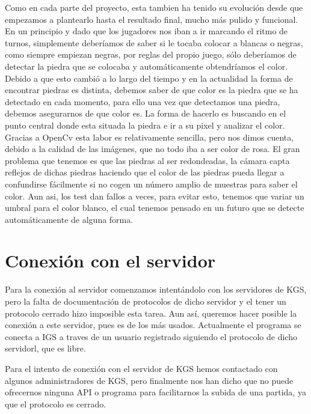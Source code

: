 \documentclass[12pt,a4paper]{report}
\begin{document}
Como en cada parte del proyecto, esta tambien ha tenido su evolución desde que
empezamos a plantearlo hasta el resultado final, mucho más pulido y funcional.
En un principio y dado que los jugadores nos iban a ir marcando el ritmo de
turnos, simplemente deberíamos de saber si le tocaba colocar a blancas o negras, como
siempre empiezan negras, por reglas del propio juego, sólo deberíamos de detectar la
piedra que se colocaba y automáticamente obtendríamos el color. 
Debido a que esto cambió a lo largo del tiempo y en la actualidad la forma de
encontrar piedras es distinta, debemos saber de que color es la piedra que se ha
detectado en cada momento, para ello una vez que detectamos una piedra, debemos
asegurarnos de que color es. La forma de hacerlo es buscando en el punto central
donde esta situada la piedra e ir a su pixel y analizar el color. Gracias a
OpenCv esta labor es relativamente sencilla, pero nos dimos cuenta, debido a la
calidad de las imágenes, que no todo iba a ser color de rosa. El gran problema
que tenemos es que las piedras al ser redondeadas, la cámara capta reflejos de
dichas piedras haciendo que el color de las piedras pueda llegar a confundirse
fácilmente si no cogen un número amplio de muestras para saber el color. Aun
asi, los test dan fallos a veces, para evitar esto, tenemos que variar un umbral
para el color blanco, el cual tenemos pensado en un futuro que se detecte
automáticamente de alguna forma.

 


\section{Conexión con el servidor}

Para la conexión al servidor comenzamos intentándolo con los servidores de KGS,
pero la falta de documentación de protocolos de dicho servidor y el tener un
protocolo cerrado hizo imposible esta tarea. Aun así, queremos hacer posible la
conexión a este servidor, pues es de los más usados. Actualmente el programa se
conecta a IGS a traves de un usuario registrado siguiendo el protocolo de dicho
servidorl, que es libre.

Para el intento de conexión con el servidor de KGS hemos contactado con algunos
administradores de KGS, pero finalmente nos han dicho que no puede ofrecernos
ninguna API o programa para facilitarnos la subida de una partida, ya que el
protocolo es cerrado. 


\end{document}
